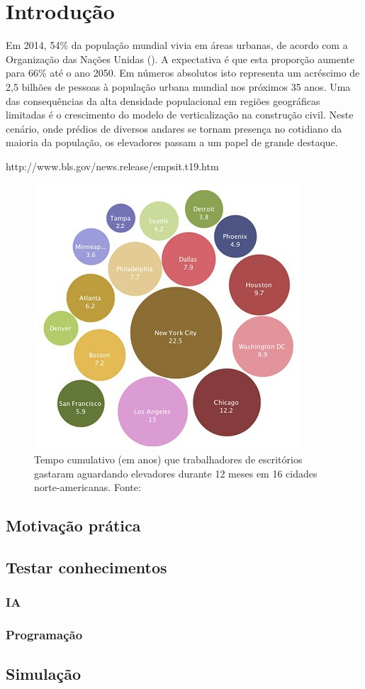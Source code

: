 \chapter{\label{chap:intro}Introdução}

Em 2014, 54\% da população mundial vivia em áreas urbanas, de acordo com a Organização das Nações Unidas (\cite{UN14}). A expectativa é que esta proporção aumente para 66\% até o ano 2050. Em números absolutos isto representa um acréscimo de 2,5 bilhões de pessoas à população urbana mundial nos próximos 35 anos. Uma das consequências da alta densidade populacional em regiões geográficas limitadas é o crescimento do modelo de verticalização na construção civil. Neste cenário, onde prédios de diversos andares se tornam presença no cotidiano da maioria da população, os elevadores passam a um papel de grande destaque.

http://www.bls.gov/news.release/empsit.t19.htm

\begin{figure}[htb!]
\centering\includegraphics{img/time-cost.jpg}
\caption{\label{fig:fig1}Tempo cumulativo (em anos) que trabalhadores de escritórios gastaram aguardando elevadores durante 12 meses em 16 cidades norte-americanas. Fonte:\cite{Horn10}}
\end{figure}

\cite{Sharma12}

\section{Motivação prática}
\section{Testar conhecimentos}
\subsection{IA}
\subsection{Programação}
\section{Simulação}